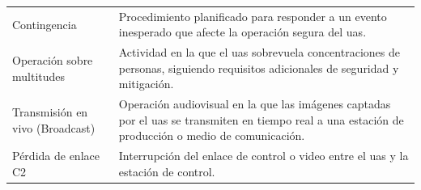 \begin{longtable}{@{}p{5cm}p{10cm}@{}}
Contingencia & Procedimiento planificado para responder a un evento inesperado que afecte la operación segura del \gls{uas}. \\
Operación sobre multitudes & Actividad en la que el \gls{uas} sobrevuela concentraciones de personas, siguiendo requisitos adicionales de seguridad y mitigación. \\
Transmisión en vivo (Broadcast) & Operación audiovisual en la que las imágenes captadas por el \gls{uas} se transmiten en tiempo real a una estación de producción o medio de comunicación. \\
Pérdida de enlace C2& Interrupción del enlace de control o video entre el \gls{uas} y la estación de control. \\
\bottomrule
\end{longtable}
